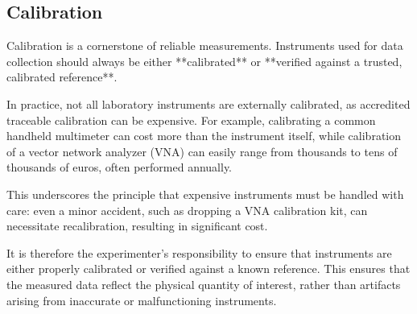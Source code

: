 \subsection{Calibration}

Calibration is a cornerstone of reliable measurements. Instruments used for data collection should always be either **calibrated** or **verified against a trusted, calibrated reference**.

In practice, not all laboratory instruments are externally calibrated, as accredited traceable calibration can be expensive. For example, calibrating a common handheld multimeter can cost more than the instrument itself, while calibration of a vector network analyzer (VNA) can easily range from thousands to tens of thousands of euros, often performed annually.

This underscores the principle that expensive instruments must be handled with care: even a minor accident, such as dropping a VNA calibration kit, can necessitate recalibration, resulting in significant cost.

It is therefore the experimenter’s responsibility to ensure that instruments are either properly calibrated or verified against a known reference. This ensures that the measured data reflect the physical quantity of interest, rather than artifacts arising from inaccurate or malfunctioning instruments.
